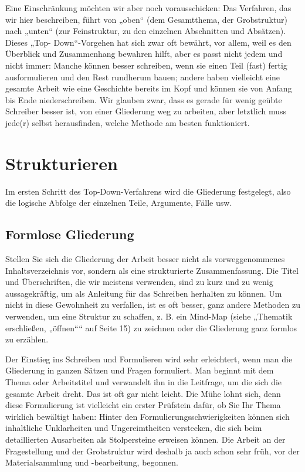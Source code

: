 \documentclass[]{book}
\theoremstyle{definition}
\theoremstyle{definition}
\theoremstyle{definition}
\theoremstyle{remark}
\begin{document}
Eine Einschränkung möchten wir aber noch vorausschicken: Das Verfahren,
das wir hier beschreiben, führt von „oben`` (dem Gesamtthema, der
Grobstruktur) nach „unten`` (zur Feinstruktur, zu den einzelnen
Abschnitten und Absätzen). Dieses „Top- Down``-Vorgehen hat sich zwar
oft bewährt, vor allem, weil es den Überblick und Zusammenhang bewahren
hilft, aber es passt nicht jedem und nicht immer: Manche können besser
schreiben, wenn sie einen Teil (fast) fertig ausformulieren und den Rest
rundherum bauen; andere haben vielleicht eine gesamte Arbeit wie eine
Geschichte bereits im Kopf und können sie von Anfang bis Ende
niederschreiben. Wir glauben zwar, dass es gerade für wenig geübte
Schreiber besser ist, von einer Gliederung weg zu arbeiten, aber
letztlich muss jede(r) selbst herausfinden, welche Methode am besten
funktioniert.

\section{Strukturieren}\label{strukturieren}

Im ersten Schritt des Top-Down-Verfahrens wird die Gliederung
festgelegt, also die logische Abfolge der einzelnen Teile, Argumente,
Fälle usw.

\subsection{Formlose Gliederung}\label{formlose-gliederung}

Stellen Sie sich die Gliederung der Arbeit besser nicht als
vorweggenommenes Inhaltsverzeichnis vor, sondern als eine strukturierte
Zusammenfassung. Die Titel und Überschriften, die wir meistens
verwenden, sind zu kurz und zu wenig aussagekräftig, um als Anleitung
für das Schreiben herhalten zu können. Um nicht in diese Gewohnheit zu
verfallen, ist es oft besser, ganz andere Methoden zu verwenden, um eine
Struktur zu schaffen, z. B. ein Mind-Map (siehe „Thematik erschließen,
„öffnen```` auf Seite 15) zu zeichnen oder die Gliederung ganz formlos
zu erzählen.

Der Einstieg ins Schreiben und Formulieren wird sehr erleichtert, wenn
man die Gliederung in ganzen Sätzen und Fragen formuliert. Man beginnt
mit dem Thema oder Arbeitstitel und verwandelt ihn in die Leitfrage, um
die sich die gesamte Arbeit dreht. Das ist oft gar nicht leicht. Die
Mühe lohnt sich, denn diese Formulierung ist vielleicht ein erster
Prüfstein dafür, ob Sie Ihr Thema wirklich bewältigt haben: Hinter den
Formulierungsschwierigkeiten können sich inhaltliche Unklarheiten und
Ungereimtheiten verstecken, die sich beim detaillierten Ausarbeiten als
Stolpersteine erweisen können. Die Arbeit an der Fragestellung und der
Grobstruktur wird deshalb ja auch schon sehr früh, vor der
Materialsammlung und -bearbeitung, begonnen.
\end{document}
